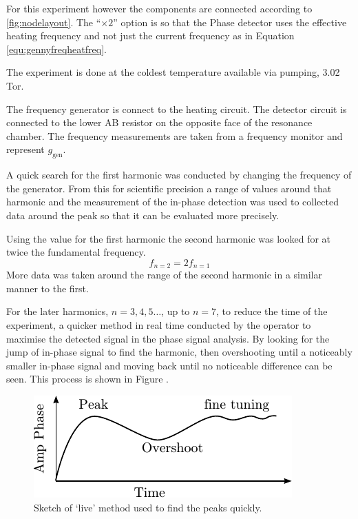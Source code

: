 For this experiment however the components are connected according to \ref{fig:nodelayout}.
The ``$\times 2$'' option is so that the Phase detector uses the effective heating frequency
and not just the current frequency as in Equation \ref{equ:gennyfreqheatfreq}.


The experiment is done at the coldest temperature available 
via pumping, 3.02 Tor.

The frequency generator is connect to the heating circuit.
The detector circuit is connected to the lower AB resistor 
on the opposite face of the resonance chamber.
The frequency measurements are taken from a frequency monitor and represent $g_\text{gen}$.

A quick search for the first harmonic was conducted by changing the frequency of the
generator.
From this for scientific precision a range of values around that harmonic 
and the measurement of the in-phase detection was used to collected data around
the peak so that it can be evaluated more precisely.

Using the value for the first harmonic the second harmonic was looked for at
twice the fundamental frequency.
\begin{equation}
f_{n=2} = 2 f_{n=1}
\end{equation}
More data was taken around the range of the second harmonic in a similar manner
to the first.

For the later harmonics, $n = 3,4,5\ldots$, up to $n=7$, to reduce the
time of the experiment, a quicker method in real time conducted by the operator to
maximise the detected signal in
the phase signal analysis.
By looking for the jump of in-phase signal to find the harmonic,
then overshooting until a noticeably smaller in-phase signal and
moving back until no noticeable difference can be seen.
This process is shown in Figure \label{fig:tuningmethod}.

\begin{figure}[htbp]
\centering
\includegraphics{pics/tuningmethod.pdf}
\caption{Sketch of `live' method used to find the peaks quickly. \label{fig:tuningmethod}}
\end{figure}

